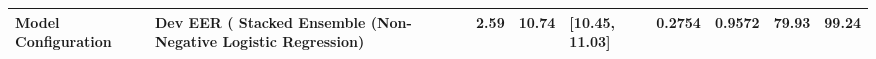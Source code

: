 \begin{tabular}{llllllll}
\toprule
Model Configuration & Dev EER (%
\midrule
Stacked Ensemble (Non-Negative Logistic Regression) & 2.59 & 10.74 & [10.45, 11.03] & 0.2754 & 0.9572 & 79.93 & 99.24 \\
\bottomrule
\end{tabular}
